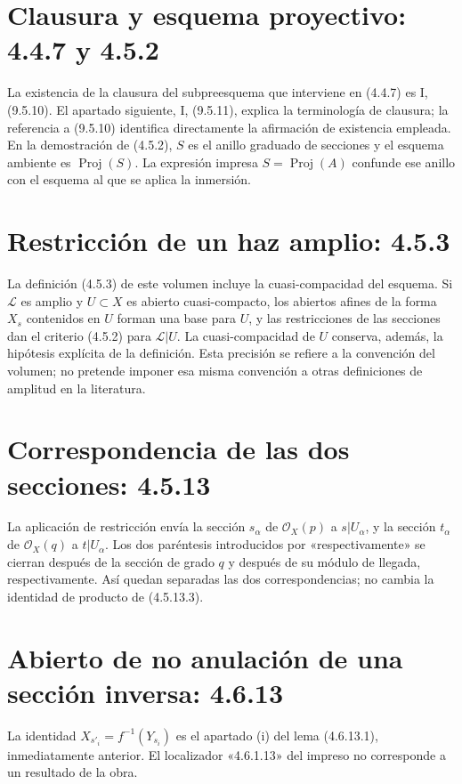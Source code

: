 \documentclass[11pt,a4paper]{article}
\DeclareMathOperator{\Proj}{Proj}
\begin{document}
\section{Clausura y esquema proyectivo: 4.4.7 y 4.5.2}
La existencia de la clausura del subpreesquema que interviene en
(4.4.7) es I, (9.5.10). El apartado siguiente, I, (9.5.11), explica
la terminología de clausura; la referencia a (9.5.10) identifica
directamente la afirmación de existencia empleada.
En la demostración de (4.5.2), $S$ es el anillo graduado de secciones
y el esquema ambiente es $\Proj(S)$. La expresión impresa
$S=\Proj(A)$ confunde ese anillo con el esquema al que se aplica
la inmersión.

\section{Restricción de un haz amplio: 4.5.3}
La definición (4.5.3) de este volumen incluye la cuasi-compacidad
del esquema. Si $\mathcal L$ es amplio y $U\subset X$ es abierto
cuasi-compacto, los abiertos afines de la forma $X_s$ contenidos
en $U$ forman una base para $U$, y las restricciones de las secciones
dan el criterio (4.5.2) para $\mathcal L|U$.
La cuasi-compacidad de $U$ conserva, además, la hipótesis explícita
de la definición. Esta precisión se refiere a la convención del
volumen; no pretende imponer esa misma convención a otras
definiciones de amplitud en la literatura.

\section{Correspondencia de las dos secciones: 4.5.13}
La aplicación de restricción envía la sección $s_\alpha$ de
$\mathcal O_X(p)$ a $s|U_\alpha$, y la sección $t_\alpha$ de
$\mathcal O_X(q)$ a $t|U_\alpha$. Los dos paréntesis introducidos
por «respectivamente» se cierran después de la sección de grado
$q$ y después de su módulo de llegada, respectivamente.
Así quedan separadas las dos correspondencias; no cambia la
identidad de producto de (4.5.13.3).

\section{Abierto de no anulación de una sección inversa: 4.6.13}
La identidad $X_{s'_i}=f^{-1}(Y_{s_i})$ es el apartado (i) del
lema (4.6.13.1), inmediatamente anterior. El localizador
«4.6.1.13» del impreso no corresponde a un resultado de la obra.
\end{document}
